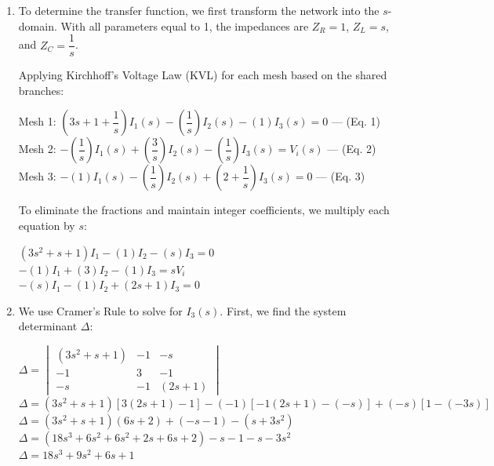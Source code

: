\documentclass[11pt]{article}
\begin{document}
\begin{enumerate}[label=(\alph*), itemindent=*, leftmargin=*, nolistsep]
	\item To determine the transfer function, we first transform the network into the $s$-domain. With all parameters equal to 1, the impedances are $Z_R = 1$, $Z_L = s$, and $Z_C = \dfrac{1}{s}$.
	
	Applying Kirchhoff’s Voltage Law (KVL) for each mesh based on the shared branches:
	\begin{center}
		Mesh 1: $(3s + 1 + \dfrac{1}{s})I_1(s) - (\dfrac{1}{s})I_2(s) - (1)I_3(s) = 0$ \hfill --- (Eq. 1) \\
		\vspace{5pt}
		Mesh 2: $-(\dfrac{1}{s})I_1(s) + (\dfrac{3}{s})I_2(s) - (\dfrac{1}{s})I_3(s) = V_i(s)$ \hfill --- (Eq. 2) \\
		\vspace{5pt}
		Mesh 3: $-(1)I_1(s) - (\dfrac{1}{s})I_2(s) + (2 + \dfrac{1}{s})I_3(s) = 0$ \hfill --- (Eq. 3)
	\end{center}

    To eliminate the fractions and maintain integer coefficients, we multiply each equation by $s$:
    \begin{center}
        $(3s^2 + s + 1)I_1 - (1)I_2 - (s)I_3 = 0$ \\
        $-(1)I_1 + (3)I_2 - (1)I_3 = sV_i$ \\
        $-(s)I_1 - (1)I_2 + (2s + 1)I_3 = 0$
    \end{center}

	\item We use Cramer's Rule to solve for $I_3(s)$. First, we find the system determinant $\Delta$:
	\begin{center}
		$\Delta = \begin{vmatrix} (3s^2 + s + 1) & -1 & -s \\ -1 & 3 & -1 \\ -s & -1 & (2s + 1) \end{vmatrix}$ \\
		\vspace{10pt}
		$\Delta = (3s^2 + s + 1)[3(2s+1) - 1] - (-1)[-1(2s+1) - (-s)] + (-s)[1 - (-3s)]$ \\
		\vspace{10pt}
		$\Delta = (3s^2 + s + 1)(6s + 2) + (-s - 1) - (s + 3s^2)$ \\
		\vspace{10pt}
		$\Delta = (18s^3 + 6s^2 + 6s^2 + 2s + 6s + 2) - s - 1 - s - 3s^2$ \\
		\vspace{10pt}
		$\Delta = 18s^3 + 9s^2 + 6s + 1$
	\end{center}


\end{enumerate}
\end{document}
